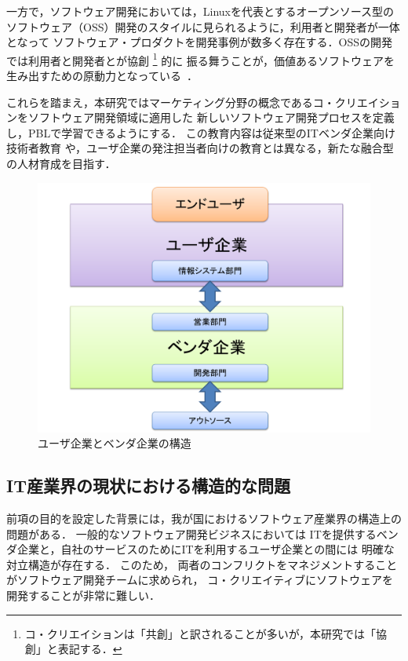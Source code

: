 \documentclass[a4j,9pt,twocolumn,twoside]{jsarticle}
\begin{document}
    一方で，ソフトウェア開発においては，Linuxを代表とするオープンソース型の
    ソフトウェア（OSS）開発のスタイルに見られるように，利用者と開発者が一体となって
    ソフトウェア・プロダクトを開発事例が数多く存在する．OSSの開発では利用者と開発者とが協創
    \footnote{コ・クリエイションは「共創」と訳されることが多いが，本研究では「協創」と表記する．}
    的に
    振る舞うことが，価値あるソフトウェアを生み出すための原動力となっている~\cite{oss}．
    
    これらを踏まえ，本研究ではマーケティング分野の概念であるコ・クリエイションをソフトウェア開発領域に適用した
    新しいソフトウェア開発プロセスを定義し，PBLで学習できるようにする．
    この教育内容は従来型のITベンダ企業向け技術者教育
    や，ユーザ企業の発注担当者向けの教育とは異なる，新たな融合型の人材育成を目指す．
    
\begin{figure}
\begin{center}
\includegraphics[width=0.9\linewidth]{figs/user_vendor_model.pdf}
\caption{ユーザ企業とベンダ企業の構造}
\label{fig:user_vendor_model}
\end{center}
\end{figure}
	
\subsection{IT産業界の現状における構造的な問題}
    前項の目的を設定した背景には，我が国におけるソフトウェア産業界の構造上の問題がある．
	一般的なソフトウェア開発ビジネスにおいては    
    ITを提供するベンダ企業と，自社のサービスのためにITを利用するユーザ企業との間には
    明確な対立構造が存在する．
    このため，
    両者のコンフリクトをマネジメントすることがソフトウェア開発チームに求められ，
    コ・クリエイティブにソフトウェアを開発することが非常に難しい．
    
\end{document}

